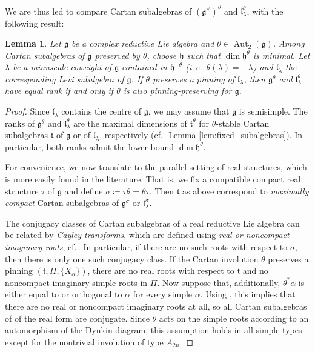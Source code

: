 \documentclass{amsart}
\newcommand{\ie}{i.\,e.}
\newcommand{\cf}{cf.\,}
\newcommand{\Aut}{\operatorname{Aut}}
\newcommand{\g}{\mathfrak{g}}
\newcommand{\h}{\mathfrak{h}}
\newcommand{\el}{\mathfrak{l}}
\newcommand{\te}{\mathfrak{t}}
\theoremstyle{definition}
\theoremstyle{plain}
\newtheorem{lem}[defn]{Lemma}
\theoremstyle{remark}
\begin{document}
We are thus led to compare Cartan subalgebras of $(\g^\vee)^\theta$ and $\el_\lambda^\theta$, with the following result:
\begin{lem}
\label{lem:rank_comparison}
    Let $\g$ be a complex reductive Lie algebra and $\theta\in \Aut_2(\g)$. Among Cartan subalgebras of $\g$ preserved by $\theta$, choose $\h$ such that $\dim \h^\theta$ is minimal. Let $\lambda$ be a minuscule coweight of $\g$ contained in $\h^{-\theta}$ (\ie\ $\theta(\lambda) = - \lambda$) and $\el_\lambda$ the corresponding Levi subalgebra of $\g$. If $\theta$ preserves a pinning of $\el_\lambda$, then $\g^\theta$ and $\el_\lambda^\theta$ have equal rank if and only if $\theta$ is also pinning-preserving for $\g$.
\end{lem}
\begin{proof}
    Since $\el_\lambda$ contains the centre of $\g$, we may assume that $\g$ is semisimple. The ranks of $\g^\theta$ and $\el_\lambda^\theta$ are the maximal dimensions of $\te^\theta$ for $\theta$-stable Cartan subalgebras $\te$ of $\g$ or of $\el_\lambda$, respectively (\cf\ Lemma \ref{lem:fixed_subalgebras}). In particular, both ranks admit the lower bound $\dim \h^\theta$. 
    
    For convenience, we now translate to the parallel setting of real structures, which is more easily found in the literature. That is, we fix a compatible compact real structure $\tau$ of $\g$ and define $\sigma\coloneqq \tau\theta = \theta\tau$. Then $\te$ as above correspond to \emph{maximally compact} Cartan subalgebras of $\g^\sigma$ or $\el_\lambda^\sigma$. 
    
    The conjugacy classes of Cartan subalgebras of a real reductive Lie algebra can be related by \emph{Cayley transforms}, which are defined using \emph{real or noncompact imaginary roots}, \cf\cite[p.\,390]{KnappLG}. In particular, if there are no such roots with respect to $\sigma$, then there is only one such conjugacy class. If the Cartan involution $\theta$ preserves a pinning $(\te,\Pi,\{X_\alpha\})$, there are no real roots with respect to $\te$ and no noncompact imaginary simple roots in $\Pi$. Now suppose that, additionally, $\theta^*\alpha$ is either equal to or orthogonal to $\alpha$ for every simple $\alpha$. Using \cite[Prop.\,6.104]{KnappLG}, this implies that there are no real or noncompact imaginary roots at all, so all Cartan subalgebras of of the real form are conjugate. Since $\theta$ acts on the simple roots according to an automorphism of the Dynkin diagram, this assumption holds in all simple types except for the nontrivial involution of type $A_{2n}$.


\end{proof}
\end{document}
